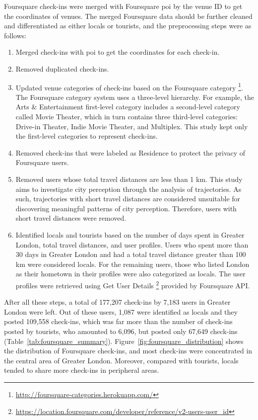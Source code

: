 \documentclass{article}
\theoremstyle{remark}
\begin{document}
Foursquare check-ins were merged with Foursquare \acrshort{poi} by the venue ID to get the coordinates of venues. The merged Foursquare data should be further cleaned and differentiated as either locals or tourists, and the preprocessing steps were as follows:
\begin{enumerate}
    \item Merged check-ins with \acrshort{poi} to get the coordinates for each check-in.
    \item Removed duplicated check-ins.
    \item Updated venue categories of check-ins based on the Foursquare category \footnote{\url{http://foursquare-categories.herokuapp.com/}}. The Foursquare category system uses a three-level hierarchy. For example, the Arts \& Entertainment first-level category includes a second-level category called Movie Theater, which in turn contains three third-level categories: Drive-in Theater, Indie Movie Theater, and Multiplex. This study kept only the first-level categories to represent 
    check-ins.
    \item Removed check-ins that were labeled as Residence to protect the privacy of Foursquare users.
    \item Removed users whose total travel distances are less than 1 km. This study aims to investigate city perception through the analysis of trajectories. As such, trajectories with short travel distances are considered unsuitable for discovering meaningful patterns of city perception. Therefore, users with short travel distances were removed.
    \item Identified locals and tourists based on the number of days spent in Greater London, total travel distances, and user profiles. Users who spent more than 30 days in Greater London and had a total travel distance greater than 100 km were considered locals. For the remaining users, those who listed London as their hometown in their profiles were also categorized as locals. The user profiles were retrieved using Get User Details \footnote{\url{https://location.foursquare.com/developer/reference/v2-users-user_id}} provided by Foursquare API.
\end{enumerate}

After all these steps, a total of 177,207 check-ins by 7,183 users in Greater London were left. Out of these users, 1,087 were identified as locals and they posted 109,558 check-ins, which was far more than the number of check-ins posted by tourists, who amounted to 6,096, but posted only 67,649 check-ins (Table~\ref{tab:foursquare_summary}). Figure~\ref{fig:foursquare_distribution} shows the distribution of Foursquare check-ins, and most check-ins were concentrated in the central area of Greater London. Moreover, compared with tourists, locals tended to share more check-ins in peripheral areas.
\end{document}
